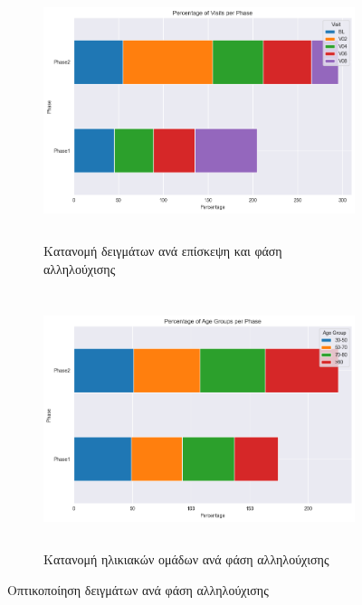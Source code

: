 \documentclass[12pt]{report}
\begin{document}
            \begin{figure}[ht]
                \centering
                \begin{subfigure}[b]{0.48\textwidth}
                    \centering
                    \includegraphics[width=\linewidth,height=7.5cm]{Chapter-2-Section-2.1/ppmi-bars-pd-ctrl-visits-per-phase.png}
                    \caption{Κατανομή δειγμάτων ανά επίσκεψη και φάση αλληλούχισης}
                    \label{fig:ppmi-bars-pd-ctrl-visits-per-phase}
                \end{subfigure}
                \hfill
                \begin{subfigure}[b]{0.48\textwidth}
                \centering
                    \includegraphics[width=\linewidth,height=7.5cm]{Chapter-2-Section-2.1/ppmi-bars-pd-ctrl-age_groups-per-phase.png}
                    \caption{Κατανομή ηλικιακών ομάδων ανά φάση αλληλούχισης}
                    \label{fig:ppmi-bars-pd-ctrl-age_groups-per-phase}
                \end{subfigure}
                \label{fig:ppmi-visit-phase-sample-distributions}
                \caption{Οπτικοποίηση δειγμάτων ανά φάση αλληλούχισης}
            \end{figure}
        \newpage
\end{document}
